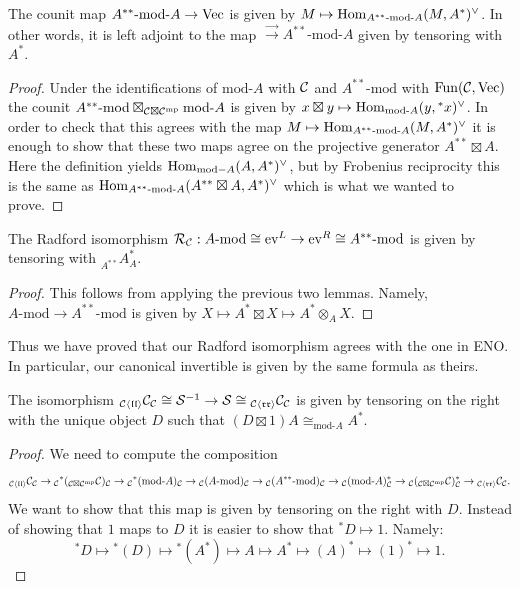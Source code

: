 \documentclass{amsart}
\begin{document}
\begin{lemma}
The counit map $A^{**}\text{-mod-}A \rightarrow \Vec$ is given by $M \mapsto \Hom_{A^{**}\text{-mod-}A}(M, A^*)^\vee$.  In other words, it is left adjoint to the map $\Vec \rightarrow A^{**}\text{-mod-}A$ given by tensoring with $A^*$.
\end{lemma}
\begin{proof}
Under the identifications of $\text{mod-}A$ with $\cC$ and $A^{**}\text{-mod}$ with $\Fun(\cC, \Vec)$ the counit $A^{**}\text{-mod} \boxtimes_{\cC \boxtimes \cC^\mp} \text{mod-}A$ is given by $x \boxtimes y \mapsto \Hom_{\text{mod-}A}(y, {}^*x)^\vee$.  In order to check that this agrees with the map $M \mapsto \Hom_{A^{**}\text{-mod-}A}(M, A^*)^\vee$ it is enough to show that these two maps agree on the projective generator $A^{**} \boxtimes A$.  Here the definition yields $\Hom_{\text{mod}-A}(A, A^*)^\vee$, but by Frobenius reciprocity this is the same as $\Hom_{A^{**}\text{-mod-}A}(A^{**} \boxtimes A, A^*)^\vee$ which is what we wanted to prove.
\end{proof}


\begin{lemma}
The Radford isomorphism $\cR_\cC: A\text{-mod} \cong \ev^L \rightarrow \ev^R \cong A^{**}\text{-mod}$ is given by tensoring with ${}_{A^{**}} A^*_{A}$.
\end{lemma}
\begin{proof}
This follows from applying the previous two lemmas.  Namely, $A\text{-mod} \rightarrow A^{**}\text{-mod}$ is given by $X \mapsto A^* \boxtimes X \mapsto A^* \otimes_A X$.
\end{proof}

Thus we have proved that our Radford isomorphism agrees with the one in ENO.  In particular, our canonical invertible is given by the same formula as theirs. 

\begin{lemma}
The isomorphism ${}_{\cC \langle \mathfrak{l l}\rangle}\cC_\cC \cong \cS^{-1} \rightarrow \cS \cong {}_{\cC \langle \mathfrak{r r}\rangle}\cC_\cC$ is given by tensoring on the right with the unique object $D$ such that $(D \boxtimes 1) A \cong_{\text{mod-}A} A^*$. 
\end{lemma}
\begin{proof}
We need to compute the composition
$${}_{\cC \langle \mathfrak{l l}\rangle}\cC_\cC \rightarrow {}_\cC {}^*({}_{\cC \boxtimes \cC^\mp} \cC)_\cC \rightarrow {}_\cC {}^*(\text{mod-}A)_\cC \rightarrow  {}_\cC (A\text{-mod})_\cC \rightarrow {}_\cC (A^{**}\text{-mod})_\cC \rightarrow  {}_\cC (\text{mod-}A)^*_\cC \rightarrow {}_\cC ({}_{\cC \boxtimes \cC^\mp} \cC)^*_\cC \rightarrow {}_{\cC \langle \mathfrak{r r}\rangle}\cC_\cC.$$
We want to show that this map is given by tensoring on the right with $D$.  Instead of showing that $1$ maps to $D$ it is easier to show that ${}^*D \mapsto 1$.  Namely:
$${}^*D \mapsto {}^*(D) \mapsto {}^*(A^*) \mapsto A \mapsto A^* \mapsto (A)^* \mapsto (1)^* \mapsto 1.$$
\end{proof}
\end{document}
